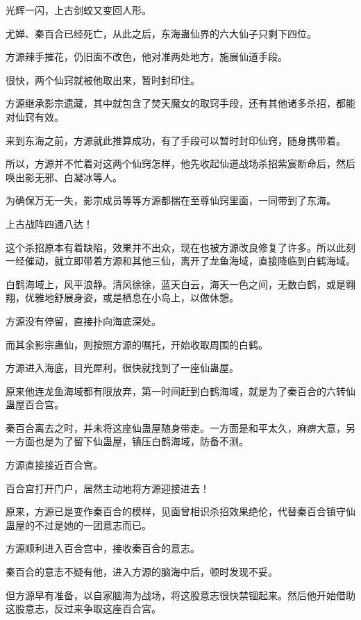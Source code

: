 
\begin{this_body}



光辉一闪，上古剑蛟又变回人形。

尤婵、秦百合已经死亡，从此之后，东海蛊仙界的六大仙子只剩下四位。

方源辣手摧花，仍旧面不改色，他对准两处地方，施展仙道手段。

很快，两个仙窍就被他取出来，暂时封印住。

方源继承影宗遗藏，其中就包含了焚天魔女的取窍手段，还有其他诸多杀招，都能对仙窍有效。

来到东海之前，方源就此推算成功，有了手段可以暂时封印仙窍，随身携带着。

所以，方源并不忙着对这两个仙窍怎样，他先收起仙道战场杀招紫宸断命后，然后唤出影无邪、白凝冰等人。

为确保万无一失，影宗成员等等方源都揣在至尊仙窍里面，一同带到了东海。

上古战阵四通八达！

这个杀招原本有着缺陷，效果并不出众，现在也被方源改良修复了许多。所以此刻一经催动，就立即带着方源和其他三仙，离开了龙鱼海域，直接降临到白鹤海域。

白鹤海域上，风平浪静。清风徐徐，蓝天白云，海天一色之间，无数白鹤，或是翱翔，优雅地舒展身姿，或是栖息在小岛上，以做休憩。

方源没有停留，直接扑向海底深处。

而其余影宗蛊仙，则按照方源的嘱托，开始收取周围的白鹤。

方源进入海底，目光犀利，很快就找到了一座仙蛊屋。

原来他连龙鱼海域都有限放弃，第一时间赶到白鹤海域，就是为了秦百合的六转仙蛊屋百合宫。

秦百合离去之时，并未将这座仙蛊屋随身带走。一方面是和平太久，麻痹大意，另一方面也是为了留下仙蛊屋，镇压白鹤海域，防备不测。

方源直接接近百合宫。

百合宫打开门户，居然主动地将方源迎接进去！

原来，方源已是变作秦百合的模样，见面曾相识杀招效果绝伦，代替秦百合镇守仙蛊屋的不过是她的一团意志而已。

方源顺利进入百合宫中，接收秦百合的意志。

秦百合的意志不疑有他，进入方源的脑海中后，顿时发现不妥。

但方源早有准备，以自家脑海为战场，将这股意志很快禁锢起来。然后他开始借助这股意志，反过来争取这座百合宫。


\end{this_body}
